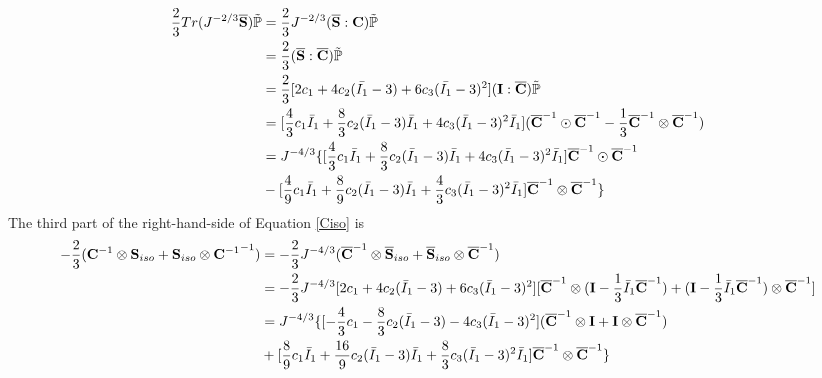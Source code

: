 \begin{equation} \label{ypart2}
\begin{split}
\frac{2}{3}Tr(J^{-2/3}\overline{\bold{S}})\tilde{\mathbb{P}} &= \frac{2}{3}J^{-2/3}(\overline{\bold{S}} : \bold{C})\tilde{\mathbb{P}} \\ 
&= \frac{2}{3} (\overline{\bold{S}} : \overline{\bold{C}})\tilde{\mathbb{P}} \\
&= \frac{2}{3} [2c_1 + 4c_2(\bar{I_1} - 3) + 6c_3(\bar{I_1} - 3)^2] (\bold{I} : \overline{\bold{C}})
\tilde{\mathbb{P}} \\
&= [\frac{4}{3}c_1{\bar{I}}_1 + \frac{8}{3}c_2({\bar{I}}_1 - 3){\bar{I}}_1 + 4c_3({\bar{I}}_1 - 3)^2{\bar{I}}_1]({\overline{\bold{C}}}^{-1} \odot {\overline{\bold{C}}}^{-1} - \frac{1}{3}{\overline{\bold{C}}}^{-1} \otimes {\overline{\bold{C}}}^{-1}) \\
&= J^{-4/3} \{ [\frac{4}{3}c_1{\bar{I}}_1 + \frac{8}{3}c_2({\bar{I}}_1 - 3){\bar{I}}_1 + 4c_3({\bar{I}}_1 - 3)^2{\bar{I}}_1]{\overline{\bold{C}}}^{-1} \odot {\overline{\bold{C}}}^{-1} \\
&-  [\frac{4}{9}c_1{\bar{I}}_1 + \frac{8}{9}c_2({\bar{I}}_1 - 3){\bar{I}}_1 + \frac{4}{3}c_3({\bar{I}}_1 - 3)^2{\bar{I}}_1]{\overline{\bold{C}}}^{-1} \otimes {\overline{\bold{C}}}^{-1} \} 
\end{split}
\end{equation}
The third part of the right-hand-side of Equation \ref{Ciso} is
\begin{equation} \label{ypart3}
\begin{split}
-\frac{2}{3}({\bold{C}}^{-1} \otimes {\bold{S}}_{iso} + {\bold{S}}_{iso} \otimes {{\bold{C}}^{-1}}^{-1}) 
&= 
-\frac{2}{3}J^{-4/3}({\overline{\bold{C}}}^{-1} \otimes {\overline{\bold{S}}}_{iso} + {\overline{\bold{S}}}_{iso} \otimes {\overline{{\bold{C}}}^{-1}}) \\
&=
-\frac{2}{3}J^{-4/3}[2c_1 + 4c_2({\bar{I}}_1 - 3) + 6c_3({\bar{I}}_1 - 3)^2]
[{\overline{\bold{C}}}^{-1} \otimes (\bold{I} - \frac{1}{3}{\bar{I}_1}{\overline{\bold{C}}}^{-1}) + 
(\bold{I} - \frac{1}{3}{\bar{I}_1}{\overline{\bold{C}}}^{-1}) \otimes {\overline{\bold{C}}}^{-1}]\\
&=
J^{-4/3} \{ [-\frac{4}{3}c_1 - \frac{8}{3}c_2({\bar{I}}_1 - 3) - 4c_3({\bar{I}}_1 - 3)^2] ({\overline{\bold{C}}}^{-1} \otimes \bold{I} + \bold{I} \otimes {\overline{\bold{C}}}^{-1}) \\
&+ [\frac{8}{9}c_1{\bar{I}}_1 + \frac{16}{9}c_2({\bar{I}}_1 - 3){\bar{I}}_1 + \frac{8}{3}c_3({\bar{I}}_1 - 3)^2{\bar{I}}_1 ] {\overline{\bold{C}}}^{-1} \otimes {\overline{\bold{C}}}^{-1}
\}
\end{split}
\end{equation}
